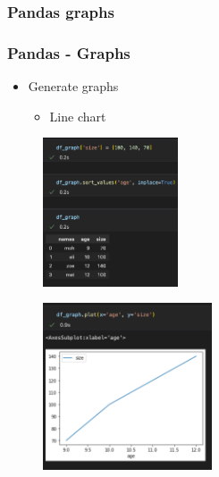 \subsubsection{Pandas graphs}


\begin{frame}\frametitle{Pandas - Graphs}
   \begin{minipage}{0.58\linewidth}
      \begin{itemize}
         \item Generate graphs
         \begin{itemize}
            \item Line chart
         \end{itemize}
      \end{itemize}
      \vspace{.5cm}
      \begin{figure}[H]
         \includegraphics[width=4cm]{../images/illustrations/pandas_df_graph_creation.png}
      \end{figure}
   \end{minipage}
   \begin{minipage}{0.38\linewidth}
      \begin{figure}[H]
         \includegraphics[width=5cm]{../images/illustrations/pandas_line_chart.png}
      \end{figure}
   \end{minipage}
\end{frame}



